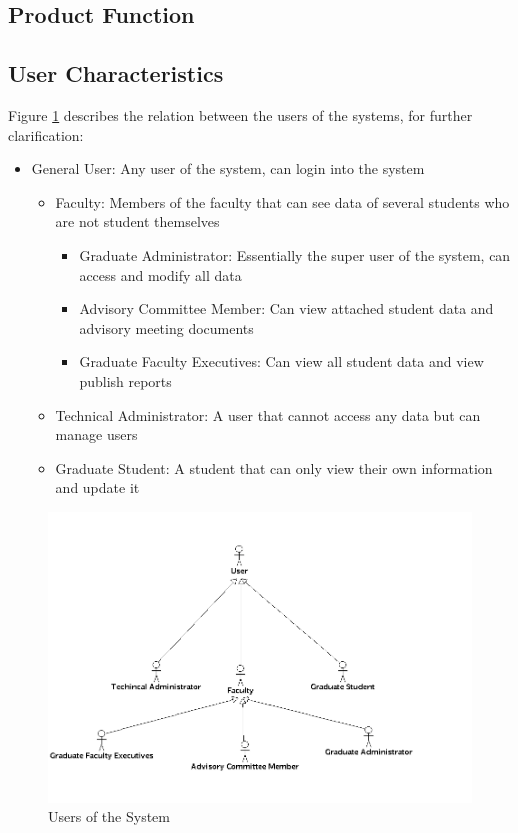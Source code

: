\documentclass{journal}
\begin{document}
\subsection{Product Function}
\subsection{User Characteristics}
Figure \ref{fig:users} describes the relation between the users of the systems, for further clarification:
\begin{itemize}
\item General User: Any user of the system, can login into the system 
\begin{itemize}
\item Faculty: Members of the faculty that can see data of several students who are not student themselves
\begin{itemize}
\item Graduate Administrator: Essentially the super user of the system, can access and modify all data 
\item Advisory Committee Member: Can view attached student data and advisory meeting documents
\item Graduate Faculty Executives: Can view all student data and view publish reports 	
\end{itemize}
\item Technical Administrator: A user that cannot access any data but can manage users 
\item Graduate Student: A student that can only view their own information and update it
\end{itemize}
\end{itemize}

\begin{figure}[htp]
\centering
\includegraphics[scale=0.40]{diagrams/use_cases/UserHeirachy_uc.png}
\caption{Users of the System}
\label{fig:users}
\end{figure}
\end{document}
